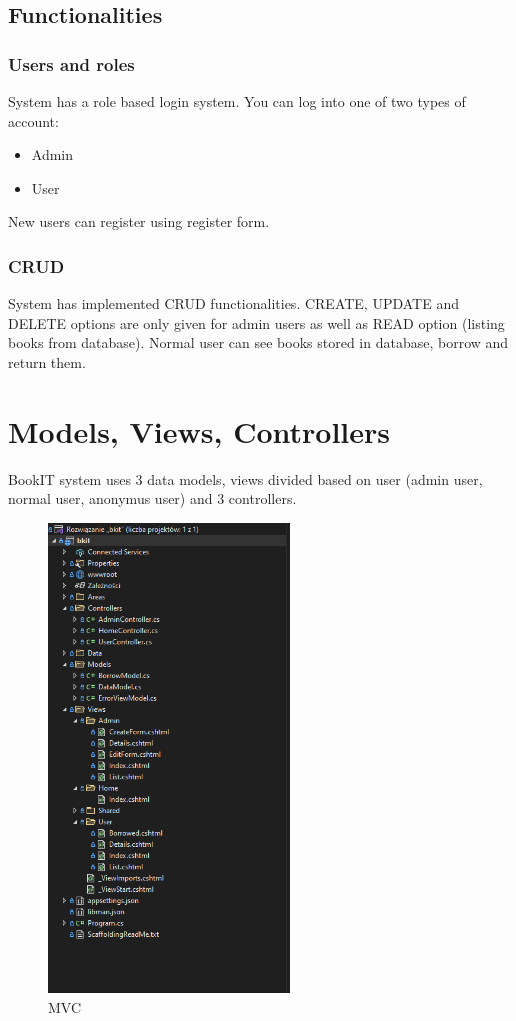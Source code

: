 \documentclass[a4paper,12pt,oneside]{article}
\begin{document}
	\subsection{Functionalities}
	
	\subsubsection{Users and roles}
	System has a role based login system. You can log into one of two types of account:
	
	\begin{itemize}
		\item  Admin 
		\item  User
	\end{itemize}


	\setlength{\parindent}{0pt}New users can register using register form.
	
	\subsubsection{CRUD}
	System has implemented CRUD functionalities. CREATE, UPDATE and DELETE options are only given for admin users as well as READ option (listing books from database). Normal user can see books stored in database, borrow and return them.
	
	\newpage
	
	\section{Models, Views, Controllers}
	BookIT system uses 3 data models, views divided based on user (admin user, normal user, anonymus user) and 3 controllers.
	
	\begin{figure}[h]
		\centering
		\includegraphics[width=0.57\textwidth]{img/mvc}
		\caption{MVC}
	\end{figure}
\end{document}
